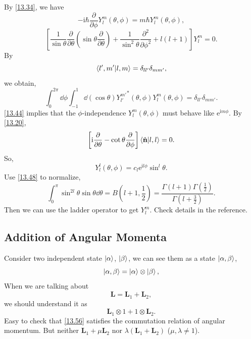 \documentclass{article}
\theoremstyle{1}
\newcommand{\pa}{\partial}
\newcommand{\ii}{\mathrm{i}}
\newcommand{\ee}{\mathrm{e}}
\begin{document}
By \eqref{13.34}, we have 
\begin{equation}\label{13.44}
    -\ii \hbar \frac{\pa}{\pa \phi}Y_l^m\left(\theta,\phi\right)=m\hbar Y_l^m\left(\theta,\phi\right),
\end{equation}
\begin{equation}
    \left[\frac{1}{\sin \theta}\frac{\pa}{\pa \theta}\left(\sin\theta\frac{\pa}{\pa \theta}\right)+\frac{1}{\sin^2\theta}\frac{\pa^2}{\pa \phi^2}+l\left(l+1\right)\right]Y_l^m=0.
\end{equation}
By 
\begin{equation}
    \bra{l',m'}\ket{l,m}=\delta_{ll'}\delta_{mm'},
\end{equation}
we obtain,
\begin{equation}\label{13.48}
    \int_{0}^{2\pi}\dd{\phi}\int_{-1}^{1}\dd{(\cos\theta)}{Y_{l'}^{m'}}^*\left(\theta,\phi\right)Y^m_l\left(\theta,\phi\right)=\delta_{ll'}\delta_{mm'}.
\end{equation}
\eqref{13.44} implies that the $\phi$-independence $Y_l^m\left(\theta,\phi\right)$ must behave like $\ee^{\ii m \phi}$. By \eqref{13.20},
\begin{equation}
    \left[\ii \frac{\pa }{\pa \theta}-\cot\theta\frac{\pa}{\pa \phi}\right]\braket{\hat{\mathbf{n}}}{l,l}=0.
\end{equation}
So, 
\begin{equation}
    Y_l^l\left(\theta,\phi\right)=c_l\ee^{\ii l\phi}\sin^l\theta.
\end{equation}
Use \eqref{13.48} to normalize,
\begin{equation}
    \int_{0}^{\pi}\sin^{2l}\theta \sin\theta \dd{\theta}=B\left(l+1,\frac{1}{2}\right)=\frac{\Gamma\left(l+1\right)\Gamma\left(\frac{1}{2}\right)}{\Gamma\left(l+\frac{3}{2}\right)}.
\end{equation}
Then we can use the ladder operator to get $Y_l^m$. Check details in the reference.


\subsection{Addition of Angular Momenta}
Consider two independent state $\ket{\alpha}$, $\ket{\beta}$, we can see them as a state $\ket{\alpha,\beta}$,
\begin{equation}
    \ket{\alpha,\beta}=\ket{\alpha}\otimes\ket{\beta},
\end{equation}
When we are talking about
\begin{equation}\label{13.56}
    \mathbf{L}=\mathbf{L}_1+\mathbf{L}_2,
\end{equation}
we should understand it as 
\begin{equation}
    \mathbf{L}_1\otimes 1+ 1\otimes \mathbf{L}_2.
\end{equation}
Easy to check that \eqref{13.56} satisfies the commutation relation of angular momentum. But neither $\mathbf{L}_1+\mu\mathbf{L}_2$ nor $\lambda\left(\mathbf{L}_1+\mathbf{L}_2\right)$ ($\mu,\lambda\neq1$).
\end{document}
